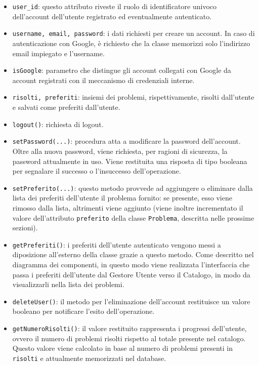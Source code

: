 \documentclass[11pt, a4paper]{article}
\theoremstyle{definition} %
\begin{document}
\begin{itemize}
    \item \texttt{user\_id}: questo attributo riveste il ruolo di identificatore
    univoco dell'account dell'utente registrato ed eventualmente autenticato.

    \item \texttt{username, email, password}: i dati richiesti per creare un
    account. In caso di autenticazione con Google, è richiesto che la classe
    memorizzi solo l'indirizzo email impiegato e l'username.

    \item \texttt{isGoogle}: parametro che distingue gli account collegati con
    Google da account registrati con il meccanismo di credenziali interne.

    \item \texttt{risolti, preferiti}: insiemi dei problemi, rispettivamente,
    risolti dall'utente e salvati come preferiti dall'utente.

    \item \texttt{logout()}: richiesta di logout.
    
    \item \texttt{setPassword(...)}: procedura atta a modificare la password
    dell'account. Oltre alla nuova password, viene richiesta, per ragioni di
    sicurezza, la password attualmente in uso. Viene restituita una risposta
    di tipo booleana per segnalare il successo o l'insuccesso dell'operazione.

    \item \texttt{setPreferito(...)}: questo metodo provvede ad aggiungere o
    eliminare dalla lista dei preferiti dell'utente il problema fornito: se
    presente, esso viene rimosso dalla lista, altrimenti viene aggiunto
    (viene inoltre incrementato il valore dell'attributo \texttt{preferito}
    della classe \texttt{Problema}, descritta nelle prossime sezioni).

    \item \texttt{getPreferiti()}: i preferiti dell'utente autenticato vengono
    messi a diposizione all'esterno della classe grazie a questo metodo.
    Come descritto nel diagramma dei componenti, in questo modo viene
    realizzata l'interfaccia che passa i preferiti dell'utente dal Gestore
    Utente verso il Catalogo, in modo da visualizzarli nella lista dei
    problemi.

    \item \texttt{deleteUser()}: il metodo per l'eliminazione dell'account
    restituisce un valore booleano per notificare l'esito dell'operazione.

    \item \texttt{getNumeroRisolti()}: il valore restituito rappresenta i
    progressi dell'utente, ovvero il numero di problemi risolti rispetto
    al totale presente nel catalogo. Questo valore viene calcolato in base
    al numero di problemi presenti in \texttt{risolti} e attualmente
    memorizzati nel database.
\end{itemize}
\end{document}
